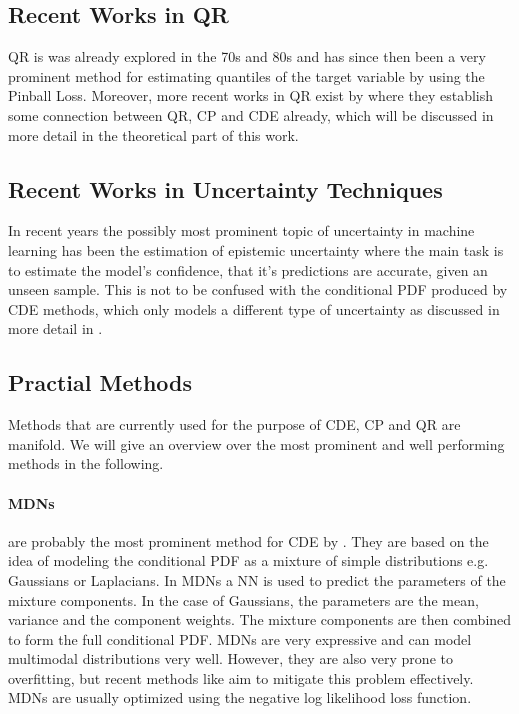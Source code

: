 \subsection{Recent Works in QR}

QR is was already explored in the 70s and 80s \cite{koenker1978regression} and has since then been a very prominent method for estimating quantiles of the target variable by using the Pinball Loss. Moreover, more recent works in QR exist by \cite{chung2020beyond} where they establish some connection between QR, CP and CDE already, which will be discussed in more detail in the theoretical part of this work.

\subsection{Recent Works in Uncertainty Techniques}

In recent years the possibly most prominent topic of uncertainty in machine learning has been the estimation of epistemic uncertainty \cite{barber1998ensemble, neal2012bayesian, gal_dropout_2016,schweighofer2023quantification, gawlikowski2023survey} where the main task is to estimate the model's confidence, that it's predictions are accurate, given an unseen sample. This is not to be confused with the conditional PDF produced by CDE methods, which only models a different type of uncertainty as discussed in more detail in .

\subsection{Practial Methods}
Methods that are currently used for the purpose of CDE, CP and QR are manifold. We will give an overview over the most prominent and well performing methods in the following.

\paragraph{MDNs} are probably the most prominent method for CDE by \cite{bishop1994mixture}. They are based on the idea of modeling the conditional PDF as a mixture of simple distributions e.g. Gaussians or Laplacians. In MDNs a NN is used to predict the parameters of the mixture components. In the case of Gaussians, the parameters are the mean, variance and the component weights. The mixture components are then combined to form the full conditional PDF. MDNs are very expressive and can model multimodal distributions very well. However, they are also very prone to overfitting, but recent methods like \cite{rothfuss2019noise} aim to mitigate this problem effectively. MDNs are usually optimized using the negative log likelihood loss function.

